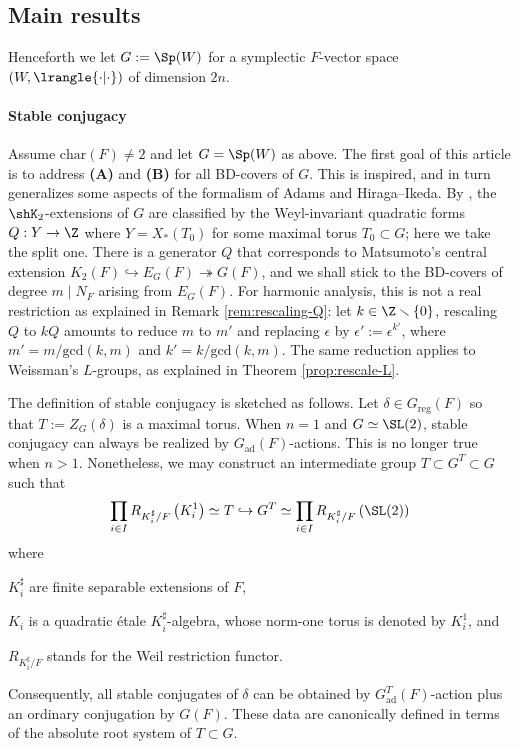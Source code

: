 \documentclass[a4paper,10pt]{article}
\begin{document}
\subsection*{Main results}
Henceforth we let $G := \Sp(W)$ for a symplectic $F$-vector space $(W, \lrangle{\cdot|\cdot})$ of dimension $2n$.
\paragraph*{Stable conjugacy}
Assume $\text{char}(F) \neq 2$ and let $G = \Sp(W)$ as above. The first goal of this article is to address \textbf{(A)} and \textbf{(B)} for all BD-covers of $G$. This is inspired, and in turn generalizes some aspects of the formalism of Adams and Hiraga--Ikeda. By \cite{BD01}, the $\shK_2$-extensions of $G$ are classified by the Weyl-invariant quadratic forms $Q: Y \to \Z$ where $Y = X_*(T_0)$ for some maximal torus $T_0 \subset G$; here we take the split one. There is a generator $Q$ that corresponds to Matsumoto's central extension $K_2(F) \hookrightarrow E_G(F) \twoheadrightarrow G(F)$, and we shall stick to the BD-covers of degree $m \mid N_F$ arising from $E_G(F)$. For harmonic analysis, this is not a real restriction as explained in Remark \ref{rem:rescaling-Q}: let $k \in \Z \smallsetminus \{0\}$, rescaling $Q$ to $kQ$ amounts to reduce $m$ to $m'$ and replacing $\epsilon$ by $\epsilon' := \epsilon^{k'}$, where $m' = m/\text{gcd}(k,m)$ and $k' = k/\text{gcd}(k,m)$. The same reduction applies to Weissman's $L$-groups, as explained in Theorem \ref{prop:rescale-L}.

The definition of stable conjugacy is sketched as follows. Let $\delta \in G_\text{reg}(F)$ so that $T := Z_G(\delta)$ is a maximal torus. When $n=1$ and $G \simeq \SL(2)$, stable conjugacy can always be realized by $G_\text{ad}(F)$-actions. This is no longer true when $n>1$. Nonetheless, we may construct an intermediate group $T \subset G^T \subset G$ such that
\[ \prod_{i \in I} R_{K_i^\sharp/F}\left( K_i^1 \right) \simeq T \hookrightarrow G^T \simeq \prod_{i \in I} R_{K_i^\sharp/F}\left( \SL(2)\right) \]
where
\begin{compactitem}
	\item $K_i^\sharp$ are finite separable extensions of $F$,
	\item $K_i$ is a quadratic étale $K_i^\sharp$-algebra, whose norm-one torus is denoted by $K_i^1$, and
	\item $R_{K_i^\sharp/F}$ stands for the Weil restriction functor.
\end{compactitem}
Consequently, all stable conjugates of $\delta$ can be obtained by $G^T_\text{ad}(F)$-action plus an ordinary conjugation by $G(F)$. These data are canonically defined in terms of the absolute root system of $T \subset G$.
\end{document}
